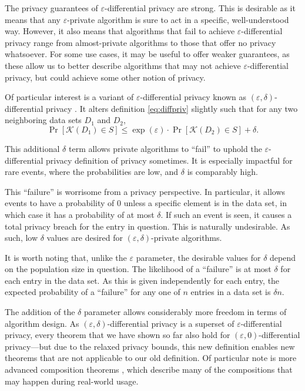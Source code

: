 \documentclass[a4paper,12pt]{article}
\newcommand{\fancy}{\mathcal}
\renewcommand{\epsilon}{\varepsilon}
\begin{document}
The privacy guarantees of $\epsilon$-differential privacy are strong. This is desirable as it means that any $\epsilon$-private algorithm is sure to act in a specific, well-understood way. However, it also means that algorithms that fail to achieve $\epsilon$-differential privacy range from almost-private algorithms to those that offer no privacy whatsoever. For some use cases, it may be useful to offer weaker guarantees, as these allow us to better describe algorithms that may not achieve $\epsilon$-differential privacy, but could achieve some other notion of privacy.

Of particular interest is a variant of $\epsilon$-differential privacy known as $(\epsilon, \delta)$-differential privacy \cite{dwork2006_delta_diffpriv}. It alters definition \ref{eq:diffpriv} slightly such that for any two neighboring data sets $D_1$ and $D_2$,
\begin{equation*}
    \Pr[\fancy{K}(D_1) \in S] \leq \exp(\epsilon) \cdot \Pr[\fancy{K}(D_2) \in S] + \delta.
\end{equation*}

This additional $\delta$ term allows private algorithms to ``fail'' to uphold the $\epsilon$-differential privacy definition of privacy sometimes. It is especially impactful for rare events, where the probabilities are low, and $\delta$ is comparably high.

This ``failure'' is worrisome from a privacy perspective. In particular, it allows events to have a probability of 0 unless a specific element is in the data set, in which case it has a probability of at most $\delta$. If such an event is seen, it causes a total privacy breach for the entry in question. This is naturally undesirable. As such, low $\delta$ values are desired for $(\epsilon,\delta)$-private algorithms.

It is worth noting that, unlike the $\epsilon$ parameter, the desirable values for $\delta$ depend on the population size in question. The likelihood of a ``failure'' is at most $\delta$ for each entry in the data set. As this is given independently for each entry, the expected probability of a ``failure'' for any one of $n$ entries in a data set is $\delta n$.

The addition of the $\delta$ parameter allows considerably more freedom in terms of algorithm design. As $(\epsilon,\delta)$-differential privacy is a superset of $\epsilon$-differential privacy, every theorem that we have shown so far also hold for $(\epsilon,0)$-differential privacy---but due to the relaxed privacy bounds, this new definition enables new theorems that are not applicable to our old definition. Of particular note is more advanced composition theorems \cite[Sec.~3.5.2]{dwork_privacybook}, which describe many of the compositions that may happen during real-world usage.
\end{document}
